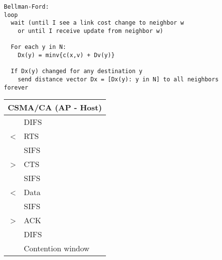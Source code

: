 \documentclass{article}
\begin{document}
\begin{verbatim}
Bellman-Ford:
loop 
  wait (until I see a link cost change to neighbor w 
    or until I receive update from neighbor w) 
 
  For each y in N:
    Dx(y) = minv{c(x,v) + Dv(y)}
 
  If Dx(y) changed for any destination y
    send distance vector Dx = [Dx(y): y in N] to all neighbors
forever 
\end{verbatim}

\begin{tabular}{|rl|}
\hline
\multicolumn{2}{|c|}{\textbf{CSMA/CA (AP - Host)}}\\
\hline
  & DIFS\\
\textless & RTS\\
  & SIFS\\
\textgreater & CTS\\
  & SIFS\\
\textless & Data\\
  & SIFS\\
\textgreater & ACK\\
  & DIFS\\
  & Contention window\\
\hline
\end{tabular}
\end{document}
